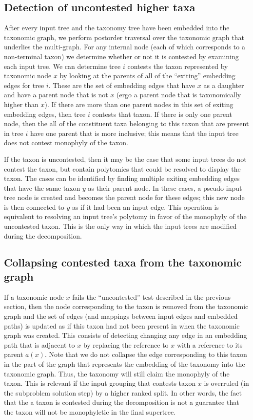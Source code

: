 \documentclass[fleqn,12pt,lineno,english]{wlpeerj}
\begin{document}
\subsection{Detection of uncontested higher taxa}

After every input tree and the taxonomy tree have been embedded into
the taxonomic graph, we perform postorder traversal over the taxonomic
graph that underlies the multi-graph. For any internal node (each
of which corresponds to a non-terminal taxon) we determine whether
or not it is contested by examining each input tree. We can determine
tree $i$ contests the taxon represented by taxonomic node $x$ by
looking at the parents of all of the ``exiting'' embedding edges
for tree $i$. These are the set of embedding edges that have $x$
as a daughter and have a parent node that is not $x$ (ergo a parent
node that is taxonomically higher than $x$). If there are more than
one parent nodes in this set of exiting embedding edges, then tree
$i$ contests that taxon. If there is only one parent node, then the all
of the constituent taxa belonging to this taxon that are present in
tree $i$ have one parent that is more inclusive; this means that
the input tree does not contest monophyly of the taxon.

If the taxon is uncontested, then it may be the case that some input
trees do not contest the taxon, but contain polytomies that could
be resolved to display the taxon. The cases can be identified by finding
multiple exiting embedding edges that have the same taxon $y$ as
their parent node. In these cases, a pseudo input tree node is created
and becomes the parent node for these edges; this new node is then
connected to $y$ as if it had been an input edge. This operation
is equivalent to resolving an input tree's polytomy in favor of the
monophyly of the uncontested taxon. This is the only way in which
the input trees are modified during the decomposition.

\subsection{Collapsing contested taxa from the taxonomic graph}

If a taxonomic node $x$ fails the ``uncontested'' test described
in the previous section, then the node corresponding to the taxon
is removed from the taxonomic graph and the set of edges (and mappings
between input edges and embedded paths) is updated as if this taxon
had not been present in when the taxonomic graph was created. This
consists of detecting changing any edge in an embedding path that
is adjacent to $x$ by replacing the reference to $x$ with a reference
to its parent $a(x)$. Note that we do not collapse the edge corresponding
to this taxon in the part of the graph that represents the embedding
of the taxonomy into the taxonomic graph. Thus, the taxonomy will
still claim the monophyly of the taxon. This is relevant if the input
grouping that contests taxon $x$ is overruled (in the subproblem
solution step) by a higher ranked split. In other words, the fact
that the a taxon is contested during the decomposition is not a guarantee
that the taxon will not be monophyletic in the final supertree.
\end{document}
